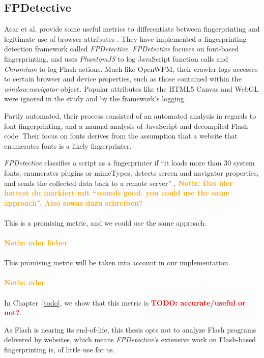 \documentclass[
    fontsize=12pt,
    headings=small,
    parskip=half,
    bibliography=totoc,
    numbers=noenddot,
    open=any
    ]{scrreprt}
\newcommand{\dominik}[1]{\textcolor{orange}{\textbf{Notiz: #1}}}
\newcommand{\todo}[1]{\textcolor{red}{\textbf{TODO: #1}}}
\begin{document}
\subsection{FPDetective}
\label{related_work:fpdetective}
Acar et al. provide some useful metrics to differentiate between fingerprinting and legitimate use of
browser attributes \cite{DBLP:conf/ccs/AcarJNDGPP13}. They have implemented a fingerprinting-detection
framework called \textit{FPDetective}.
\textit{FPDetective} focuses on font-based fingerprinting, and uses
\textit{PhantomJS} to log JavaScript function calls and \textit{Chromium} to log Flash actions.
Much like OpenWPM, their crawler logs accesses to certain browser and device properties, such as
those contained within the \textit{window.navigator} object.
Popular attributes like the HTML5 Canvas and WebGL were ignored in the study and by the framework's logging.

Partly automated, their process consisted of an automated analysis in regards to font fingerprinting,
and a manual analysis of JavaScript and decompiled Flash code.
Their focus on fonts derives from the assumption that a website that
enumerates fonts is a likely fingerprinter.

\textit{FPDetective} classifies a script as a fingerprinter if ``it loads more than 30 system fonts, enumerates plugins
or mimeTypes, detects screen and navigator properties, and sends the collected data back to a remote server''
\cite{DBLP:conf/ccs/AcarJNDGPP13}.
\dominik{Das hier hattest du markiert mit ``sounds good. you could use the same approach''. Also sowas dazu schreiben?} \\ \\
This is a promising metric, and we could use the same approach. \\ \\
\dominik{oder lieber} \\ \\
This promising metric will be taken into account in our implementation. \\ \\
\dominik{oder} \\ \\
In Chapter~\ref{todo}, we show that this metric is \todo{accurate/useful or not?}.

As Flash is nearing its end-of-life, this thesis opts not to analyze Flash programs
delivered by websites, which means \textit{FPDetective}'s extensive work on Flash-based fingerprinting
is, of little use for us.
\end{document}
